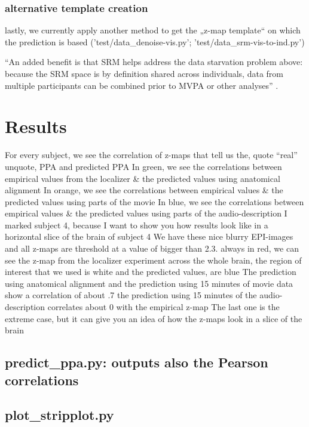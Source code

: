 {\subsubsection{alternative template creation}
%
lastly, we currently apply another method to get the „z-map template“ on which
the prediction is based ('test/data\_denoise-vis.py';
'test/data\_srm-vis-to-ind.py')

%
``An added benefit is that SRM helps address the data starvation problem above:
because the SRM space is by definition shared across individuals, data from
multiple participants can be combined prior to MVPA or other analyses''
\citep{cohen2017computational}.


\section{Results}


%
For every subject, we see the correlation of z-maps that tell us the, quote
``real'' unquote, PPA and predicted PPA
%
In green, we see the correlations between empirical values from the localizer \&
the predicted values using anatomical alignment
%
In orange, we see the correlations between empirical values \& the predicted
values using parts of the movie
%
In blue, we see the correlations between empirical values \& the predicted
values using parts of the audio-description
%
I marked subject 4, because I want to show you how results look like in a
horizontal slice of the brain of subject 4
%
We have these nice blurry EPI-images and all z-maps are threshold at a value of
bigger than 2.3.
%
always in red, we can see the z-map from the localizer experiment across the
whole brain,
%
the region of interest that we used is white and the predicted values, are blue
%
The prediction using anatomical alignment and the prediction using 15 minutes of
movie data show a correlation of about .7
%
the prediction using 15 minutes of the audio-description correlates about 0 with
the empirical z-map
%
The last one is the extreme case, but it can give you an idea of how the z-maps
look in a slice of the brain


\subsection{predict\_ppa.py: outputs also the Pearson correlations}


\subsection{plot\_stripplot.py}

}
